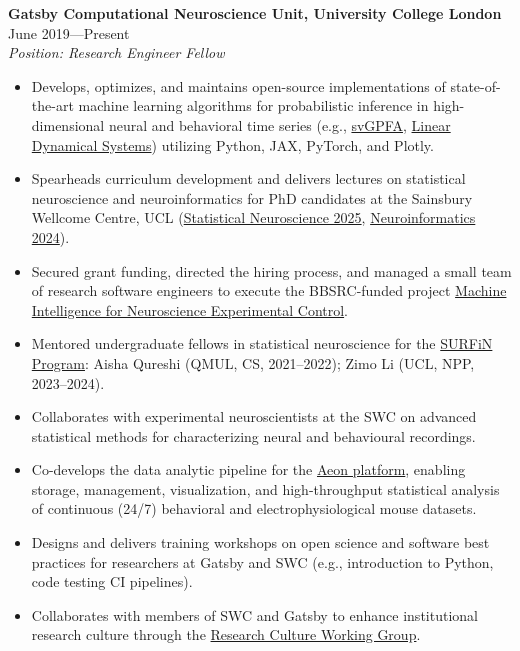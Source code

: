 \documentclass[10pt]{article}
\newcommand{\sectionleft}[1]{\noindent\makebox[0pt][r]{\makebox[1.1in][l]{\textbf{#1}}\hspace{0.2in}}}
\begin{document}
\sectionleft{Academic}%
\textbf{Gatsby Computational Neuroscience Unit, University College London} \hfill June 2019---Present \\
\sectionleft{Experience}%
\textit{Position: Research Engineer Fellow}
\begin{itemize}[leftmargin=1.5em, topsep=2pt, itemsep=1pt, parsep=1pt]
    \item Develops, optimizes, and maintains open-source implementations of state-of-the-art machine learning algorithms for probabilistic inference in high-dimensional neural and behavioral time series (e.g., \href{https://github.com/joacorapela/svGPFA}{svGPFA}, \href{https://github.com/joacorapela/ssm}{Linear Dynamical Systems}) utilizing Python, JAX, PyTorch, and Plotly.
    \item Spearheads curriculum development and delivers lectures on statistical neuroscience and neuroinformatics for PhD candidates at the Sainsbury Wellcome Centre, UCL (\href{https://github.com/joacorapela/statNeuro2025}{Statistical Neuroscience 2025}, \href{https://github.com/joacorapela/neuroinformatics24}{Neuroinformatics 2024}).
    \item Secured grant funding, directed the hiring process, and managed a small team of research software engineers to execute the BBSRC-funded project \href{https://gtr.ukri.org/projects?ref=BB\%2FW019132\%2F1}{Machine Intelligence for Neuroscience Experimental Control}.
    \item Mentored undergraduate fellows in statistical neuroscience for the \href{https://www.simonsfoundation.org/grant/shenoy-undergraduate-research-fellowship-in-neuroscience-surfin/}{SURFiN Program}: Aisha Qureshi (QMUL, CS, 2021--2022); Zimo Li (UCL, NPP, 2023--2024).
    \item Collaborates with experimental neuroscientists at the SWC on advanced statistical methods for characterizing neural and behavioural recordings.
    \item Co-develops the data analytic pipeline for the \href{https://www.biorxiv.org/content/10.1101/2025.07.31.664513v1}{Aeon platform}, enabling storage, management, visualization, and high-throughput statistical analysis of continuous (24/7) behavioral and electrophysiological mouse datasets.
    \item Designs and delivers training workshops on open science and software best practices for researchers at Gatsby and SWC (e.g., introduction to Python, code testing CI pipelines).
    \item Collaborates with members of SWC and Gatsby to enhance institutional research culture through the \href{https://sainsburywellcomecentre.github.io/RCWG/}{Research Culture Working Group}.
\end{itemize}
\end{document}

